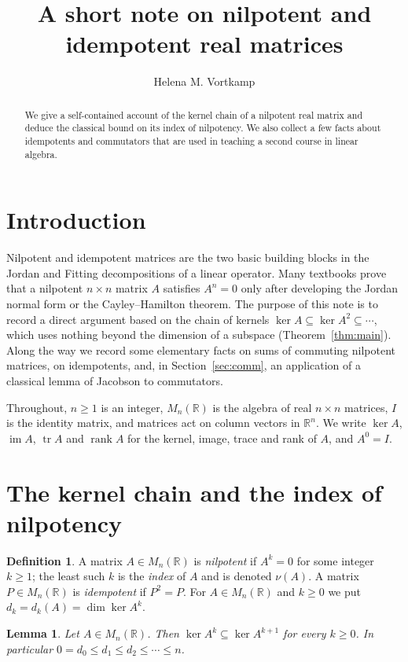 \documentclass[11pt]{amsart}
\title{A short note on nilpotent and idempotent real matrices}
\author{Helena M. Vortkamp}
\date{}
\newtheorem{lemma}[theorem]{Lemma}
\theoremstyle{definition}
\newtheorem{definition}[theorem]{Definition}
\theoremstyle{remark}
\newcommand{\R}{\mathbb{R}}
\newcommand{\M}{M_n(\R)}
\DeclareMathOperator{\tr}{tr}
\DeclareMathOperator{\rank}{rank}
\DeclareMathOperator{\im}{im}
\begin{document}
\begin{abstract}
We give a self-contained account of the kernel chain of a nilpotent real
matrix and deduce the classical bound on its index of nilpotency. We also
collect a few facts about idempotents and commutators that are used in
teaching a second course in linear algebra.
\end{abstract}

\maketitle

\section{Introduction}

Nilpotent and idempotent matrices are the two basic building blocks in the
Jordan and Fitting decompositions of a linear operator. Many textbooks prove
that a nilpotent $n\times n$ matrix $A$ satisfies $A^n=0$ only after
developing the Jordan normal form or the Cayley--Hamilton theorem. The purpose
of this note is to record a direct argument based on the chain of kernels
$\ker A\subseteq\ker A^2\subseteq\cdots$, which uses nothing beyond the
dimension of a subspace (Theorem~\ref{thm:main}). Along the way we record
some elementary facts on sums of commuting nilpotent matrices, on idempotents,
and, in Section~\ref{sec:comm}, an application of a classical lemma of
Jacobson to commutators.

Throughout, $n\ge 1$ is an integer, $\M$ is the algebra of real $n\times n$
matrices, $I$ is the identity matrix, and matrices act on column vectors in
$\R^n$. We write $\ker A$, $\im A$, $\tr A$ and $\rank A$ for the kernel,
image, trace and rank of $A$, and $A^0=I$.

\section{The kernel chain and the index of nilpotency}

\begin{definition}\label{def:basic}
A matrix $A\in\M$ is \emph{nilpotent} if $A^k=0$ for some integer $k\ge 1$;
the least such $k$ is the \emph{index} of $A$ and is denoted $\nu(A)$.
A matrix $P\in\M$ is \emph{idempotent} if $P^2=P$. For $A\in\M$ and
$k\ge 0$ we put $d_k=d_k(A)=\dim\ker A^k$.
\end{definition}

\begin{lemma}\label{lem:chain}
Let $A\in\M$. Then $\ker A^k\subseteq\ker A^{k+1}$ for every $k\ge 0$. In
particular $0=d_0\le d_1\le d_2\le\cdots\le n$.
\end{lemma}
\end{document}

